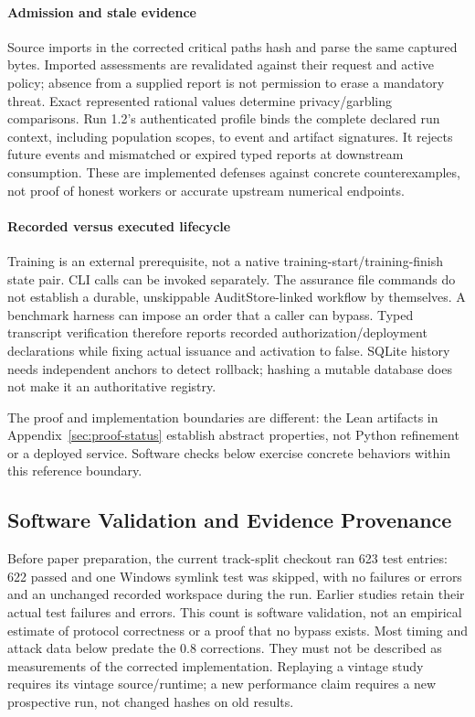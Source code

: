 \documentclass[conference,compsoc]{IEEEtran}
\begin{document}
\paragraph{Admission and stale evidence}
Source imports in the corrected critical paths hash and parse the same captured
bytes. Imported assessments are revalidated against their request and active
policy; absence from a supplied report is not permission to erase a mandatory
threat. Exact represented rational values determine privacy/garbling
comparisons. Run 1.2's authenticated profile binds the complete declared run
context, including population scopes, to event and artifact signatures. It
rejects future events and mismatched or expired typed reports at downstream
consumption. These are implemented defenses against concrete counterexamples,
not proof of honest workers or accurate upstream numerical endpoints.

\paragraph{Recorded versus executed lifecycle}
Training is an external prerequisite, not a native training-start/training-finish
state pair. CLI calls can be
invoked separately. The assurance file commands do not establish a durable,
unskippable AuditStore-linked workflow by themselves. A benchmark harness
can impose an order that a caller can bypass. Typed transcript verification
therefore reports recorded authorization/deployment declarations while fixing
actual issuance and activation to false. SQLite history needs independent
anchors to detect rollback; hashing a mutable database does not make it an
authoritative registry.

The proof and implementation boundaries are different: the Lean artifacts in
Appendix~\ref{sec:proof-status} establish abstract properties, not Python
refinement or a deployed service. Software checks below exercise concrete
behaviors within this reference boundary.

\subsection{Software Validation and Evidence Provenance}
Before paper preparation, the current track-split checkout ran 623 test entries:
622 passed and one Windows symlink test was skipped, with no failures or errors
and an unchanged recorded workspace during the run. Earlier studies retain
their actual test failures and errors. This count is software validation, not
an empirical estimate of protocol correctness or a proof that no bypass exists.
Most timing and attack data below predate the 0.8 corrections. They must not be
described as measurements of the corrected implementation. Replaying a vintage
study requires its vintage source/runtime; a new performance claim requires
a new prospective run, not changed hashes on old results.
\end{document}
